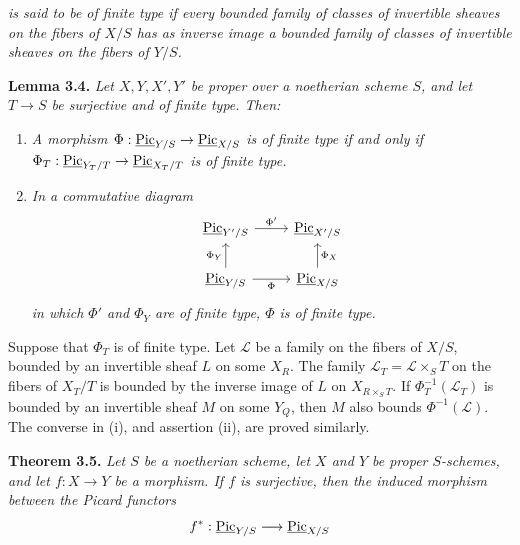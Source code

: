 
\emph{is said to be of finite type if every bounded family of classes of
invertible sheaves on the fibers of \(X/S\) has as inverse image a bounded
family of classes of invertible sheaves on the fibers of \(Y/S\).}

\textbf{Lemma 3.4.} \emph{Let \(X,Y,X',Y'\) be proper over a noetherian
scheme \(S\), and let \(T\to S\) be surjective and of finite type. Then:}
\begin{enumerate}[label=(\roman*)]
\item \emph{A morphism
\(\Phi:\underline{\operatorname{Pic}}_{Y/S}\to\underline{\operatorname{Pic}}_{X/S}\)
is of finite type if and only if
\(\Phi_T:\underline{\operatorname{Pic}}_{Y_T/T}\to\underline{\operatorname{Pic}}_{X_T/T}\)
is of finite type.}
\item \emph{In a commutative diagram}
\[
\begin{tikzcd}
\underline{\Pic}_{Y'/S}\arrow[r,"\Phi'"]&
\underline{\Pic}_{X'/S}\\
\underline{\Pic}_{Y/S}\arrow[r,"\Phi"']\arrow[u,"\Phi_Y"]&
\underline{\Pic}_{X/S}\arrow[u,"\Phi_X"']
\end{tikzcd}
\]
\emph{in which \(\Phi'\) and \(\Phi_Y\) are of finite type, \(\Phi\) is
of finite type.}
\end{enumerate}

Suppose that \(\Phi_T\) is of finite type. Let \(\mathscr L\) be a family
on the fibers of \(X/S\), bounded by an invertible sheaf \(L\) on some
\(X_R\). The family \(\mathscr L_T=\mathscr L\times_S T\) on the fibers of
\(X_T/T\) is bounded by the inverse image of \(L\) on
\(X_{R\times_S T}\). If \(\Phi_T^{-1}(\mathscr L_T)\) is bounded by an
invertible sheaf \(M\) on some \(Y_Q\), then \(M\) also bounds
\(\Phi^{-1}(\mathscr L)\). The converse in (i), and assertion (ii), are
proved similarly.

\textbf{Theorem 3.5.} \emph{Let \(S\) be a noetherian scheme, let \(X\)
and \(Y\) be proper \(S\)-schemes, and let \(f:X\to Y\) be a morphism. If
\(f\) is surjective, then the induced morphism between the Picard
functors}
\[
f^*:\underline{\operatorname{Pic}}_{Y/S}\longrightarrow\underline{\operatorname{Pic}}_{X/S}
\]

